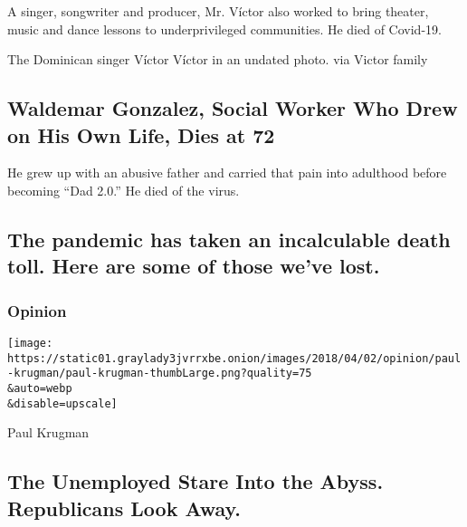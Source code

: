 A singer, songwriter and producer, Mr. Víctor also worked to bring
theater, music and dance lessons to underprivileged communities. He died
of Covid-19.

\href{/2020/08/01/obituaries/victor-victor-dead-coronavirus.html}{}

The Dominican singer Víctor Víctor in an undated photo. via Victor
family

\href{/2020/07/30/obituaries/waldemar-gonzalez-dead-coronavirus.html}{}

\hypertarget{waldemar-gonzalez-social-worker-who-drew-on-his-own-life-dies-at-72}{%
\subsection{Waldemar Gonzalez, Social Worker Who Drew on His Own Life,
Dies at
72}\label{waldemar-gonzalez-social-worker-who-drew-on-his-own-life-dies-at-72}}

He grew up with an abusive father and carried that pain into adulthood
before becoming ``Dad 2.0.'' He died of the virus.

\href{/interactive/2020/obituaries/people-died-coronavirus-obituaries.html}{}

\hypertarget{the-pandemic-has-taken-an-incalculable-death-toll-here-are-some-of-those-weve-lost}{%
\subsection{The pandemic has taken an incalculable death toll. Here are
some of those we've
lost.}\label{the-pandemic-has-taken-an-incalculable-death-toll-here-are-some-of-those-weve-lost}}

\href{https://www.nytimes3xbfgragh.onion/section/opinion?pagetype=Homepage\&action=click\&module=Opinion}{}

\hypertarget{opinion}{%
\subsubsection{Opinion}\label{opinion}}

\href{/2020/08/03/opinion/republicans-unemployed-coronavirus.html}{}

\texttt{[image: https://static01.graylady3jvrrxbe.onion/images/2018/04/02/opinion/paul-krugman/paul-krugman-thumbLarge.png?quality=75\\\&auto=webp\\\&disable=upscale]}

Paul Krugman

\hypertarget{the-unemployed-stare-into-the-abyss-republicans-look-away}{%
\subsection{The Unemployed Stare Into the Abyss. Republicans Look
Away.}\label{the-unemployed-stare-into-the-abyss-republicans-look-away}}

